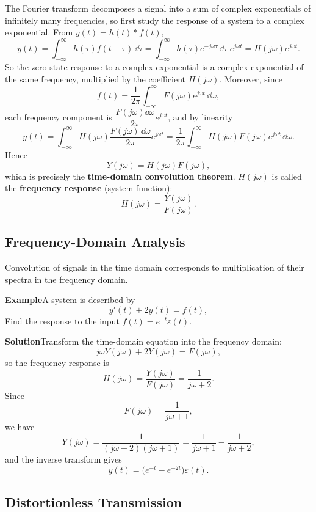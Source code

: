 The Fourier transform decomposes a signal into a sum of complex exponentials
of infinitely many frequencies, so first study the response of a system to a
complex exponential. From $y(t)=h(t)*f(t)$,
\[
    y(t)=\int_{-\infty}^{\infty}h(\tau)f(t-\tau)\,\dd\tau
    =\int_{-\infty}^{\infty}h(\tau)e^{-j\omega\tau}\,\dd\tau\;e^{j\omega t}
    =H(j\omega)e^{j\omega t}.
\]
So the zero-state response to a complex exponential is a complex exponential
of the same frequency, multiplied by the coefficient $H(j\omega)$. Moreover,
since
\[
    f(t)=\frac{1}{2\pi}\int_{-\infty}^{\infty}F(j\omega)e^{j\omega t}\,\dd\omega,
\]
each frequency component is $\dfrac{F(j\omega)\dd\omega}{2\pi}e^{j\omega t}$,
and by linearity
\[
    y(t)=\int_{-\infty}^{\infty}H(j\omega)\frac{F(j\omega)\,\dd\omega}{2\pi}e^{j\omega t}
    =\frac{1}{2\pi}\int_{-\infty}^{\infty}H(j\omega)F(j\omega)e^{j\omega t}\,\dd\omega .
\]
Hence
\[
    Y(j\omega)=H(j\omega)F(j\omega),
\]
which is precisely the \textbf{time-domain convolution theorem}. $H(j\omega)$
is called the \textbf{frequency response} (system function):
\[
    H(j\omega)=\frac{Y(j\omega)}{F(j\omega)} .
\]

\subsection{Frequency-Domain Analysis}

Convolution of signals in the time domain corresponds to multiplication of
their spectra in the frequency domain.

\begin{note}
\textbf{Example}\quad A system is described by
\[
    y'(t)+2y(t)=f(t),
\]
Find the response to the input $f(t)=e^{-t}\varepsilon(t)$.

\textbf{Solution}\quad Transform the time-domain equation into the frequency
domain:
\[
    j\omega Y(j\omega)+2Y(j\omega)=F(j\omega),
\]
so the frequency response is
\[
    H(j\omega)=\frac{Y(j\omega)}{F(j\omega)}=\frac{1}{j\omega+2}.
\]
Since
\[
    F(j\omega)=\frac{1}{j\omega+1},
\]
we have
\[
    Y(j\omega)=\frac{1}{(j\omega+2)(j\omega+1)}
    =\frac{1}{j\omega+1}-\frac{1}{j\omega+2},
\]
and the inverse transform gives
\[
    y(t)=\bigl(e^{-t}-e^{-2t}\bigr)\varepsilon(t).
\]
\end{note}

\subsection{Distortionless Transmission}

